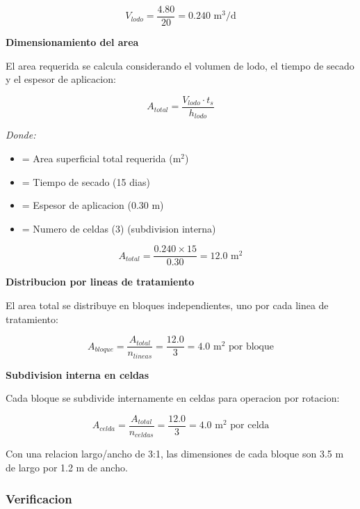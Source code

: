 \documentclass[12pt,a4paper]{article}
\begin{document}
\begin{equation}
V_{lodo} = \frac{4.80}{20} = 0.240 \text{ m}^3\text{/d}
\end{equation}

\textbf{Dimensionamiento del area}

El area requerida se calcula considerando el volumen de lodo, el tiempo de secado y el espesor de aplicacion:

\begin{equation}
A_{total} = \frac{V_{lodo} \cdot t_s}{h_{lodo}}
\end{equation}

\textit{Donde:}
\begin{itemize}[noitemsep,leftmargin=2em]
    \item[$A_{total}$] = Area superficial total requerida (m$^2$)
    \item[$t_s$] = Tiempo de secado (15 dias)
    \item[$h_{lodo}$] = Espesor de aplicacion (0.30 m)
    \item[$n_{celdas}$] = Numero de celdas (3) (subdivision interna)
\end{itemize}

\begin{equation}
A_{total} = \frac{0.240 \times 15}{0.30} = 12.0 \text{ m}^2
\end{equation}

\textbf{Distribucion por lineas de tratamiento}

El area total se distribuye en bloques independientes, uno por cada linea de tratamiento:

\begin{equation}
A_{bloque} = \frac{A_{total}}{n_{lineas}} = \frac{12.0}{3} = 4.0 \text{ m}^2 \text{ por bloque}
\end{equation}

\textbf{Subdivision interna en celdas}

Cada bloque se subdivide internamente en celdas para operacion por rotacion:

\begin{equation}
A_{celda} = \frac{A_{total}}{n_{celdas}} = \frac{12.0}{3} = 4.0 \text{ m}^2 \text{ por celda}
\end{equation}

Con una relacion largo/ancho de 3:1, las dimensiones de cada bloque son 3.5 m de largo por 1.2 m de ancho.

\subsubsection{Verificacion}
\end{document}
